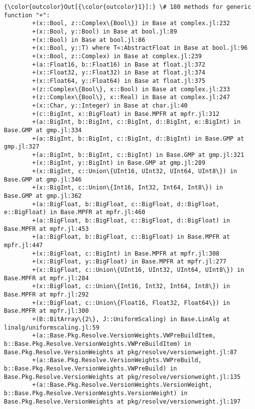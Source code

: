 \documentclass[11pt]{article}
\begin{document}
            \begin{Verbatim}[commandchars=\\\{\}]
{\color{outcolor}Out[{\color{outcolor}1}]:} \# 180 methods for generic function "+":
        +(x::Bool, z::Complex\{Bool\}) in Base at complex.jl:232
        +(x::Bool, y::Bool) in Base at bool.jl:89
        +(x::Bool) in Base at bool.jl:86
        +(x::Bool, y::T) where T<:AbstractFloat in Base at bool.jl:96
        +(x::Bool, z::Complex) in Base at complex.jl:239
        +(a::Float16, b::Float16) in Base at float.jl:372
        +(x::Float32, y::Float32) in Base at float.jl:374
        +(x::Float64, y::Float64) in Base at float.jl:375
        +(z::Complex\{Bool\}, x::Bool) in Base at complex.jl:233
        +(z::Complex\{Bool\}, x::Real) in Base at complex.jl:247
        +(x::Char, y::Integer) in Base at char.jl:40
        +(c::BigInt, x::BigFloat) in Base.MPFR at mpfr.jl:312
        +(a::BigInt, b::BigInt, c::BigInt, d::BigInt, e::BigInt) in Base.GMP at gmp.jl:334
        +(a::BigInt, b::BigInt, c::BigInt, d::BigInt) in Base.GMP at gmp.jl:327
        +(a::BigInt, b::BigInt, c::BigInt) in Base.GMP at gmp.jl:321
        +(x::BigInt, y::BigInt) in Base.GMP at gmp.jl:289
        +(x::BigInt, c::Union\{UInt16, UInt32, UInt64, UInt8\}) in Base.GMP at gmp.jl:346
        +(x::BigInt, c::Union\{Int16, Int32, Int64, Int8\}) in Base.GMP at gmp.jl:362
        +(a::BigFloat, b::BigFloat, c::BigFloat, d::BigFloat, e::BigFloat) in Base.MPFR at mpfr.jl:460
        +(a::BigFloat, b::BigFloat, c::BigFloat, d::BigFloat) in Base.MPFR at mpfr.jl:453
        +(a::BigFloat, b::BigFloat, c::BigFloat) in Base.MPFR at mpfr.jl:447
        +(x::BigFloat, c::BigInt) in Base.MPFR at mpfr.jl:308
        +(x::BigFloat, y::BigFloat) in Base.MPFR at mpfr.jl:277
        +(x::BigFloat, c::Union\{UInt16, UInt32, UInt64, UInt8\}) in Base.MPFR at mpfr.jl:284
        +(x::BigFloat, c::Union\{Int16, Int32, Int64, Int8\}) in Base.MPFR at mpfr.jl:292
        +(x::BigFloat, c::Union\{Float16, Float32, Float64\}) in Base.MPFR at mpfr.jl:300
        +(B::BitArray\{2\}, J::UniformScaling) in Base.LinAlg at linalg/uniformscaling.jl:59
        +(a::Base.Pkg.Resolve.VersionWeights.VWPreBuildItem, b::Base.Pkg.Resolve.VersionWeights.VWPreBuildItem) in Base.Pkg.Resolve.VersionWeights at pkg/resolve/versionweight.jl:87
        +(a::Base.Pkg.Resolve.VersionWeights.VWPreBuild, b::Base.Pkg.Resolve.VersionWeights.VWPreBuild) in Base.Pkg.Resolve.VersionWeights at pkg/resolve/versionweight.jl:135
        +(a::Base.Pkg.Resolve.VersionWeights.VersionWeight, b::Base.Pkg.Resolve.VersionWeights.VersionWeight) in Base.Pkg.Resolve.VersionWeights at pkg/resolve/versionweight.jl:197

\end{Verbatim}
\end{document}
